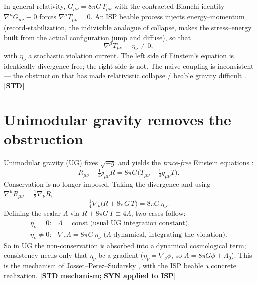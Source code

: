 \documentclass[aps,prd,preprint,amsmath,amssymb,nofootinbib,superscriptaddress]{revtex4-2}
\begin{document}
In general relativity, $G_{\mu\nu}=8\pi G\,T_{\mu\nu}$ with the contracted Bianchi identity
$\nabla^\mu G_{\mu\nu}\equiv0$ forces $\nabla^\mu T_{\mu\nu}=0$. An ISP beable process
injects energy--momentum (record-stabilization, the indivisible analogue of collapse,
makes the stress--energy built from the actual configuration jump and diffuse), so that
\begin{equation}
\nabla^\mu T_{\mu\nu}=\eta_\nu\neq0 ,
\end{equation}
with $\eta_\nu$ a stochastic violation current. The left side of Einstein's equation is
identically divergence-free; the right side is not. The naive coupling is inconsistent ---
the obstruction that has made relativistic collapse / beable gravity difficult
\cite{Bassi2013}. \textbf{[STD]}

\section{Unimodular gravity removes the obstruction}

Unimodular gravity (UG) fixes $\sqrt{-g}$ and yields the \emph{trace-free} Einstein
equations \cite{HenneauxTeitelboim1989,Unruh1989}:
\begin{equation}
R_{\mu\nu}-\tfrac14 g_{\mu\nu}R = 8\pi G\big(T_{\mu\nu}-\tfrac14 g_{\mu\nu}T\big).
\end{equation}
Conservation is no longer imposed. Taking the divergence and using
$\nabla^\mu R_{\mu\nu}=\tfrac12\nabla_\nu R$,
\begin{equation}
\tfrac14\nabla_\nu\big(R+8\pi G\,T\big)=8\pi G\,\eta_\nu .
\end{equation}
Defining the scalar $\Lambda$ via $R+8\pi G\,T\equiv4\Lambda$, two cases follow:
\begin{equation}
\boxed{\;
\begin{array}{ll}
\eta_\nu=0: & \Lambda=\text{const (usual UG integration constant)},\\[3pt]
\eta_\nu\neq0: & \nabla_\nu\Lambda=8\pi G\,\eta_\nu\ \ (\Lambda\text{ dynamical, integrating the violation)}.
\end{array}\;}
\end{equation}
So in UG the non-conservation is absorbed into a dynamical cosmological term; consistency
needs only that $\eta_\nu$ be a gradient ($\eta_\nu=\nabla_\nu\phi$, so
$\Lambda=8\pi G\phi+\Lambda_0$). This is the mechanism of Josset--Perez--Sudarsky
\cite{Josset2017}, with the ISP beable a concrete realization. \textbf{[STD mechanism; SYN
applied to ISP]}
\end{document}
